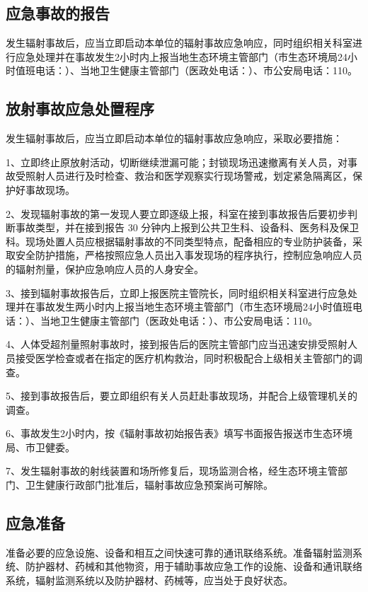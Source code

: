 \subsection{应急事故的报告}

发生辐射事故后，应当立即启动本单位的辐射事故应急响应，同时组织相关科室进行应急处理并在事故发生2小时内上报当地生态环境主管部门（市生态环境局24小时值班电话：\localenvphone）、当地卫生健康主管部门（医政处电话：\localhealthphone）、市公安局电话：110。

\subsection{放射事故应急处置程序}

发生辐射事故后，应当立即启动本单位的辐射事故应急响应，采取必要措施：

1、立即终止原放射活动，切断继续泄漏可能；封锁现场迅速撤离有关人员，对事故受照射人员进行及时检查、救治和医学观察实行现场警戒，划定紧急隔离区，保护好事故现场。

2、发现辐射事故的第一发现人要立即逐级上报，科室在接到事故报告后要初步判断事故类型，并在接到报告 30 分钟内上报到公共卫生科、设备科、医务科及保卫科。现场处置人员应根据辐射事故的不同类型特点，配备相应的专业防护装备，采取安全防护措施，严格按照应急人员出入事发现场的程序执行，控制应急响应人员的辐射剂量，保护应急响应人员的人身安全。

3、接到辐射事故报告后，立即上报医院主管院长，同时组织相关科室进行应急处理并在事故发生两小时内上报当地生态环境主管部门（市生态环境局24小时值班电话：\localenvphone）、当地卫生健康主管部门（医政处电话：\localhealthphone）、市公安局电话：110。

4、人体受超剂量照射事故时，接到报告后的医院主管部门应当迅速安排受照射人员接受医学检查或者在指定的医疗机构救治，同时积极配合上级相关主管部门的调查。

5、接到事故报告后，要立即组织有关人员赶赴事故现场，并配合上级管理机关的调查。

6、事故发生2小时内，按《辐射事故初始报告表》填写书面报告报送市生态环境局、市卫健委。

7、发生辐射事故的射线装置和场所修复后，现场监测合格，经生态环境主管部门、卫生健康行政部门批准后，辐射事故应急预案尚可解除。

\subsection{应急准备}

准备必要的应急设施、设备和相互之间快速可靠的通讯联络系统。准备辐射监测系统、防护器材、药械和其他物资，用于辅助事故应急工作的设施、设备和通讯联络系统，辐射监测系统以及防护器材、药械等，应当处于良好状态。

